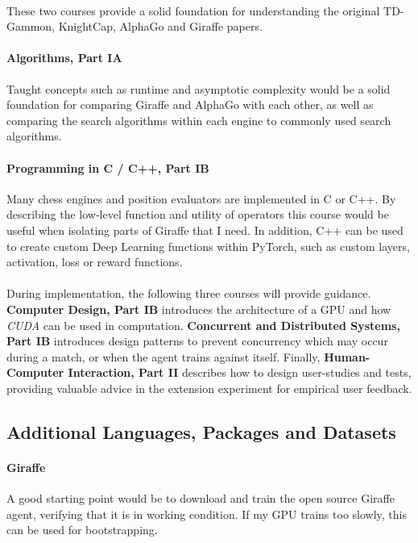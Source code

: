 \documentclass[12pt,a4paper]{book}
\begin{document}
\paragraph{} These two courses provide a solid foundation for understanding the original TD-Gammon, KnightCap, AlphaGo and Giraffe papers.

\paragraph{Algorithms, Part IA} Taught concepts such as runtime and asymptotic complexity would be a solid foundation for comparing Giraffe and AlphaGo with each other, as well as comparing the search algorithms within each engine to commonly used search algorithms.

\paragraph{Programming in C / C++, Part IB} Many chess engines and position evaluators are implemented in C or C++. By describing the low-level function and utility of operators this course would be useful when isolating parts of Giraffe that I need. In addition, C++ can be used to create custom Deep Learning functions within PyTorch, such as custom layers, activation, loss or reward functions.

\paragraph{} During implementation, the following three courses will provide guidance. \textbf{Computer Design, Part IB} introduces the architecture of a GPU and how \textit{CUDA} can be used in computation. \textbf{Concurrent and Distributed Systems, Part IB} introduces design patterns to prevent concurrency which may occur during a match, or when the agent trains against itself. Finally, \textbf{Human-Computer Interaction, Part II} describes how to design user-studies and tests, providing valuable advice in the extension experiment for empirical user feedback.


\subsection*{Additional Languages, Packages and Datasets}

\paragraph{Giraffe} A good starting point would be to download and train the open source Giraffe agent, verifying that it is in working condition. If my GPU trains too slowly, this can be used for bootstrapping.
\end{document}

